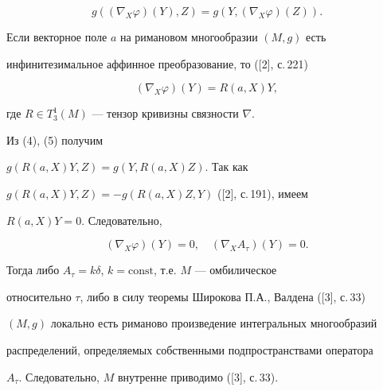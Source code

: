 \begin{equation}


g((\nabla _{X} \varphi )(Y),Z) =g(Y,(\nabla _{X} \varphi )(Z)).


\end{equation}





Если векторное поле $a$ на римановом многообразии $(M,g)$ есть


инфинитезимальное аффинное преобразование, то ([2], с.\,221)


\begin{equation}


(\nabla _{X} \varphi )(Y) = R(a,X)Y ,


\end{equation}


где $R\in T^{1}_{3}(M)$ --- тензор кривизны связности $\nabla$.





Из (4), (5) получим


$g(R(a,X)Y,Z)= g(Y,R(a,X)Z)$. Так как


$g(R(a,X)Y,Z)=- g(R(a,X)Z,Y)$ ([2], с.\,191), имеем


$R(a,X)Y=0$. Следовательно,


$$


(\nabla _{X} \varphi )(Y)=0 , \quad


(\nabla _{X} A_{\tau})(Y)=0.


$$


Тогда либо $A_{\tau}=k\delta$, $k=\text{const}$, т.е. $M$ --- омбилическое


относительно $\tau$, либо в силу теоремы Широкова П.А., Валдена ([3], с.\,33)


$(M,g)$ локально есть риманово произведение интегральных многообразий


распределений, определяемых собственными подпространствами оператора


$A_{\tau}$. Следовательно, $M$ внутренне приводимо ([3], с.\,33).  





